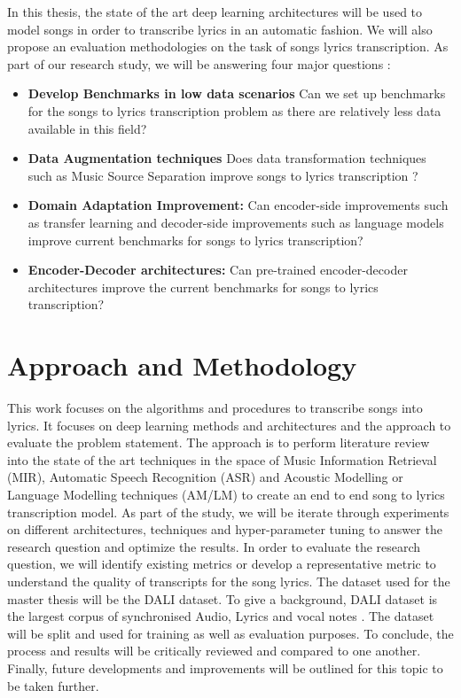 In this thesis, the state of the art deep learning architectures will be used to model songs in order to transcribe lyrics in an automatic fashion. We will also propose an evaluation methodologies on the task of songs lyrics transcription. As part of our research study, we will be answering four major questions :

\begin{itemize}
    \item \textbf{Develop Benchmarks in low data scenarios} Can we set up benchmarks for the songs to lyrics transcription problem as there are relatively less data available in this field?
    \item \textbf{Data Augmentation techniques} Does data transformation techniques such as Music Source Separation improve songs to lyrics transcription ?
    \item \textbf{Domain Adaptation Improvement:} Can encoder-side improvements such as transfer learning and decoder-side improvements such as language models improve current benchmarks for songs to lyrics transcription?
    \item \textbf{Encoder-Decoder architectures:} Can pre-trained encoder-decoder architectures improve the current benchmarks for songs to lyrics transcription?

\end{itemize}

\section{Approach and Methodology}

This work focuses on the algorithms and procedures to transcribe songs into lyrics. It focuses on deep learning methods and architectures and the approach to evaluate the problem statement. The approach is to perform literature review into the state of the art techniques in the space of Music Information Retrieval (MIR), Automatic Speech Recognition (ASR) and Acoustic Modelling or Language Modelling techniques (AM/LM) to create an end to end song to lyrics transcription model. As part of the study, we will be iterate through experiments on different architectures, techniques and hyper-parameter tuning to answer the research question and optimize the results. In order to evaluate the research question, we will identify existing metrics or develop a representative metric to understand the quality of transcripts for the song lyrics. The dataset used for the master thesis will be the DALI dataset. To give a background, DALI dataset is the largest corpus of  synchronised Audio, Lyrics and vocal notes \cite{meseguer2020creating}. The dataset will be split and used for training as well as evaluation purposes. To conclude, the process and results will be critically reviewed and compared to one another. Finally, future developments and improvements will be outlined for this topic to be taken further.

